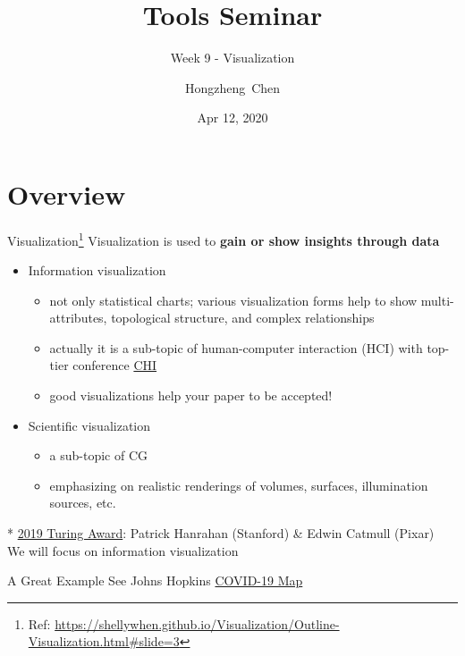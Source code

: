 \documentclass{../TexTemplate/myslide}
\title[ToolsSeminar]{Tools Seminar}
\subtitle{Week 9 - Visualization}
\author[chhzh123]{Hongzheng~Chen}
\date[Apr 12, 2020]{Apr 12, 2020}
\begin{document}
\begin{frame}
\titlepage
\end{frame}

\begin{frame}
\tableofcontents
\end{frame}

\section{Overview}
\begin{frame}
\sectionpage
\end{frame}

\begin{frame}{Visualization\protect\footnote{Ref: \url{https://shellywhen.github.io/Visualization/Outline-Visualization.html\#slide=3}}}
Visualization is used to \textbf{gain or show insights through data}
\begin{itemize}
	\item Information visualization
	\begin{itemize}
		\item not only statistical charts; various visualization forms help to show multi-attributes, topological structure, and complex relationships
		\item actually it is a sub-topic of human-computer interaction (HCI) with top-tier conference \href{https://chi2020.acm.org/}{CHI}
		\item good visualizations help your paper to be accepted!
	\end{itemize}
	\item Scientific visualization
	\begin{itemize}
		\item a sub-topic of CG
		\item emphasizing on realistic renderings of volumes, surfaces, illumination sources, etc.
	\end{itemize}
\end{itemize}
* \href{https://awards.acm.org/about/2019-turing}{2019 Turing Award}: Patrick Hanrahan (Stanford) \& Edwin Catmull (Pixar)
\\\pause
We will focus on information visualization
\end{frame}

\begin{frame}{A Great Example}
See Johns Hopkins \href{https://coronavirus.jhu.edu/map.html}{COVID-19 Map}
\end{frame}
\end{document}
